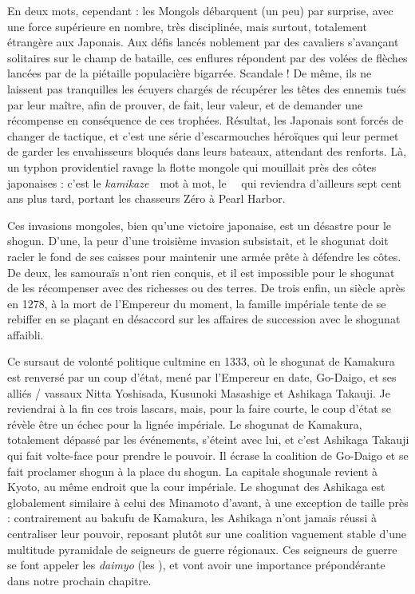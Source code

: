 En deux mots, cependant : les Mongols débarquent (un peu) par surprise, avec
une force supérieure en nombre, très disciplinée, mais surtout, totalement
étrangère aux Japonais. Aux défis lancés noblement par des cavaliers s'avançant
solitaires sur le champ de bataille, ces enflures répondent par des volées de
flèches lancées par de la piétaille populacière bigarrée. Scandale ! De même,
ils ne laissent pas tranquilles les écuyers chargés de récupérer les têtes des
ennemis tués par leur maître, afin de prouver, de fait, leur valeur, et de
demander une récompense en conséquence de ces trophées. Résultat, les Japonais
sont forcés de changer de tactique, et c'est une série d'escarmouches héroïques
qui leur permet de garder les envahisseurs bloqués dans leurs bateaux,
attendant des renforts. Là, un typhon providentiel ravage la flotte mongole qui
mouillait près des côtes japonaises : c'est le \emph{kamikaze}~\incise~mot à
mot, le ~\incise~qui reviendra d'ailleurs sept cent ans plus
tard, portant les chasseurs Zéro à Pearl Harbor.

Ces invasions mongoles, bien qu'une victoire japonaise, est un désastre pour le
shogun. D'une, la peur d'une troisième invasion subsistait, et le shogunat doit
racler le fond de ses caisses pour maintenir une armée prête à défendre les
côtes. De deux, les samouraïs n'ont rien conquis, et il est impossible pour le
shogunat de les récompenser avec des richesses ou des terres. De trois enfin,
un siècle après en 1278, à la mort de l'Empereur du moment, la famille
impériale tente de se rebiffer en se plaçant en désaccord sur les affaires de
succession avec le shogunat affaibli.

Ce sursaut de volonté politique cultmine en 1333, où le shogunat de Kamakura
est renversé par un coup d'état, mené par l'Empereur en date, Go-Daigo, et ses
alliés / vassaux Nitta Yoshisada, Kusunoki Masashige et Ashikaga Takauji. Je
reviendrai à la fin ces trois lascars, mais, pour la faire courte, le coup
d'état se révèle être un échec pour la lignée impériale. Le shogunat de
Kamakura, totalement dépassé par les événements, s'éteint avec lui, et c'est
Ashikaga Takauji qui fait volte-face pour prendre le pouvoir. Il écrase la
coalition de Go-Daigo et se fait proclamer shogun à la place du shogun. La
capitale shogunale revient à Kyoto, au même endroit que la cour impériale. Le
shogunat des Ashikaga est globalement similaire à celui des Minamoto d'avant, à
une exception de taille près : contrairement au bakufu de Kamakura, les
Ashikaga n'ont jamais réussi à centraliser leur pouvoir, reposant plutôt sur
une coalition vaguement stable d'une multitude pyramidale de seigneurs de
guerre régionaux. Ces seigneurs de guerre se font appeler les \emph{daimyo}
(les ), et vont avoir une importance prépondérante dans notre
prochain chapitre.

